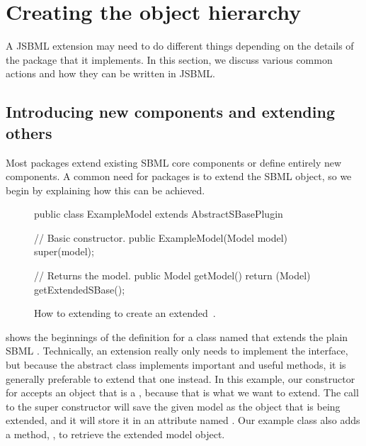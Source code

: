 
\section{Creating the object hierarchy}
\label{sec:creating-obj-hierarchy}

A JSBML extension may need to do different things depending on the details
of the \SBMLthree package that it implements.  In this section, we discuss
various common actions and how they can be written in JSBML.


\subsection{Introducing new components and extending others}
\label{subsec:addingClasses}

Most \SBMLthree packages extend existing SBML core components or define
entirely new components.  A common need for packages is to extend the SBML
\Model object, so we begin by explaining how this can be achieved.

\begin{figure}[t]
  \begin{example}
public class ExampleModel extends AbstractSBasePlugin {

  // Basic constructor.
  public ExampleModel(Model model) {
    super(model);
  }

  // Returns the model.
  public Model getModel() {
    return (Model) getExtendedSBase();
  }
}\end{example}
  \caption{How to extending \AbstractSBasePlugin to create an extended
    \,\Model.}
  \label{lst:ModelExtClass}
\end{figure}

 shows the beginnings of the definition for
a class named  that extends the plain SBML
\Model. Technically, an extension really only needs to implement the
\SBasePlugin interface, but because the abstract class \AbstractSBasePlugin
implements important and useful methods, it is generally preferable to
extend that one instead.  In this example, our constructor for
 accepts an object that is a \Model, because that is
what we want to extend.  The call to the super constructor will save the
given model as the \SBase object that is being extended, and it will store
it in an attribute named . Our example
 class also adds a method, , to
retrieve the extended model object.

